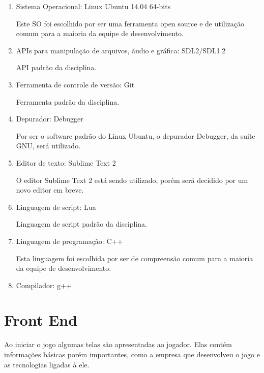 \documentclass{article}
\begin{document}
\begin{enumerate}
\item Sistema Operacional: Linux Ubuntu 14.04 64-bits

Este SO foi escolhido por ser uma ferramenta open source e de utilização comum para a maioria da equipe de desenvolvimento.

\item APIs para manipulação de arquivos, áudio e gráfica: SDL2/SDL1.2

API padrão da disciplina.

\item Ferramenta de controle de versão: Git

Ferramenta padrão da disciplina.

\item Depurador: Debugger

Por ser o software padrão do Linux Ubuntu, o depurador Debugger, da suite GNU, será utilizado.

\item Editor de texto: Sublime Text 2 

O editor Sublime Text 2 está sendo utilizado, porém será decidido por um novo editor em breve.

\item Linguagem de script: Lua

Linguagem de script padrão da disciplina.

\item Linguagem de programação: C++

Esta linguagem foi escolhida por ser de compreensão comum para a maioria da equipe de desenvolvimento.

\item Compilador: g++

\end{enumerate}

\section{Front End}
Ao iniciar o jogo algumas telas são apresentadas ao jogador. Elas contém informações básicas porém importantes, como a empresa que desenvolveu o jogo e as tecnologias ligadas à ele. 
\end{document}
